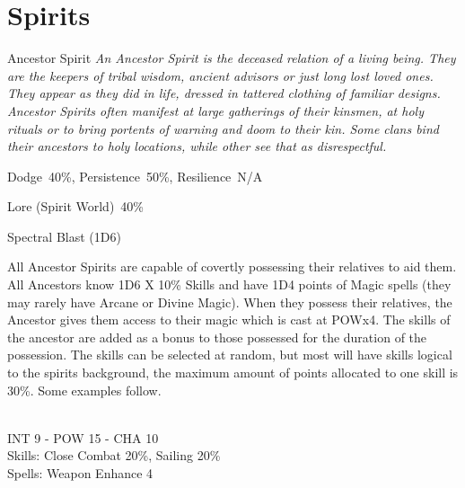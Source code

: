 
\clearpage



\section{Spirits}
\label{sec:spirits}

\begin{samepage}
\begin{monsterbox}{Ancestor Spirit}
	\textit{An Ancestor Spirit is the deceased relation of a living being. They are the keepers of tribal wisdom, ancient advisors or just long lost loved ones. They appear as they did in life, dressed in tattered clothing of familiar designs. Ancestor Spirits often manifest at large gatherings of their kinsmen, at holy rituals or to bring portents of warning and doom to their kin. Some clans bind their ancestors to holy locations, while other see that as disrespectful.}\\
	\rpghline
	\basics[%
	powerpoints = 17,
	movementrate = 30m,
	plunderrating = 0
	]
	\rpghline%
	\stats[ %
		STR = -,
		CON = -,
		DEX = -,
		SIZ = -,
		INT = 3D6    (11),
		POW = 3D6+6  (17),
		CHA = 3D6    (11)
	]
	\rpghline%
	\begin{rpg-monsteraction}[Resistances]
		Dodge~40\%, Persistence~50\%, Resilience~N/A
	\end{rpg-monsteraction}
	\begin{rpg-monsteraction}[Knowledge]
		Lore (Spirit World)~40\%
	\end{rpg-monsteraction}
	\begin{rpg-monsteraction}
		Spectral Blast (1D6)
	\end{rpg-monsteraction}
	\begin{rpg-monsteraction}
		All Ancestor Spirits are capable of covertly possessing their relatives to aid them. All Ancestors know 1D6 X 10\% Skills and have 1D4 points of Magic spells (they may rarely have Arcane or Divine Magic). When they possess their relatives, the Ancestor gives them access to their magic which is cast at POWx4. The skills of the ancestor are added as a bonus to those possessed for the duration of the possession. The skills can be selected at random, but most will have skills logical to the spirits background, the maximum amount of points allocated to one skill is 30\%. Some examples follow.
	\end{rpg-monsteraction}
	\begin{rpg-monsteraction}
		\\INT 9 - POW 15 - CHA 10\\
		Skills: Close Combat 20\%, Sailing 20\%\\
                Spells: Weapon Enhance 4
	\end{rpg-monsteraction}


\end{monsterbox}
\end{samepage}
